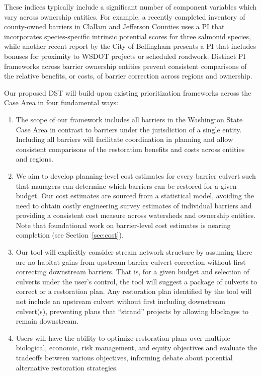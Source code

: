 \documentclass[12pt]{elsarticle}
\begin{document}
These indices typically include a significant number of component variables which vary across ownership entities. For example, a recently completed inventory of county-owned barriers in Clallam and Jefferson Counties uses a PI that incorporates species-specific intrinsic potential scores for three salmonid species, while another recent report by the City of Bellingham presents a PI that includes bonuses for proximity to WSDOT projects or scheduled roadwork. Distinct PI frameworks across barrier ownership entities prevent consistent comparisons of the relative benefits, or costs, of barrier correction across regions and ownership. 

Our proposed DST will build upon existing prioritization frameworks across the Case Area in four fundamental ways: 

\begin{enumerate}
\item The scope of our framework includes all barriers in the Washington State Case Area in contrast to barriers under the jurisdiction of a single entity. Including all barriers will facilitate coordination in planning and allow consistent comparisons of the restoration benefits and costs across entities and regions. 
\item We aim to develop planning-level cost estimates for every barrier culvert such that managers can determine which barriers can be restored for a given budget. Our cost estimates are sourced from a statistical model, avoiding the need to obtain costly engineering survey estimates of individual barriers and providing a consistent cost measure across watersheds and ownership entities. Note that foundational work on barrier-level cost estimates is nearing completion (see Section~\ref{sec:cost}).
\item Our tool will explicitly consider stream network structure by assuming there are no habitat gains from upstream barrier culvert correction without first correcting downstream barriers. That is, for a given budget and selection of culverts under the user's control, the tool will suggest a package of culverts to correct or a restoration plan. Any restoration plan identified by the tool will not include an upstream culvert without first including downstream culvert(s), preventing plans that ``strand'' projects by allowing blockages to remain downstream. 
\item Users will have the ability to optimize restoration plans over multiple biological, economic, risk management, and equity objectives and evaluate the tradeoffs between various objectives, informing debate about potential alternative restoration strategies. 
\end{enumerate}
\end{document}
